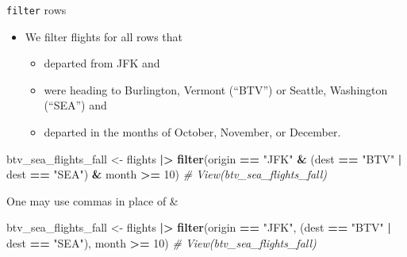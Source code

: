 \documentclass[
  ignorenonframetext,
]{beamer}
\newenvironment{Shaded}{\begin{snugshade}}{\end{snugshade}}
\newcommand{\CommentTok}[1]{\textcolor[rgb]{0.56,0.35,0.01}{\textit{#1}}}
\newcommand{\DecValTok}[1]{\textcolor[rgb]{0.00,0.00,0.81}{#1}}
\newcommand{\FunctionTok}[1]{\textcolor[rgb]{0.13,0.29,0.53}{\textbf{#1}}}
\newcommand{\NormalTok}[1]{#1}
\newcommand{\OtherTok}[1]{\textcolor[rgb]{0.56,0.35,0.01}{#1}}
\newcommand{\SpecialCharTok}[1]{\textcolor[rgb]{0.81,0.36,0.00}{\textbf{#1}}}
\newcommand{\StringTok}[1]{\textcolor[rgb]{0.31,0.60,0.02}{#1}}
\providecommand{\tightlist}{%
  \setlength{\itemsep}{0pt}\setlength{\parskip}{0pt}}
\begin{document}
\begin{frame}[fragile]{\texttt{filter} rows}
\label{filter-rows-3}
\begin{itemize}
\item
  We filter flights for all rows that

  \begin{itemize}
  \tightlist
  \item
    departed from JFK and
  \item
    were heading to Burlington, Vermont (``BTV'') or Seattle, Washington
    (``SEA'') and
  \item
    departed in the months of October, November, or December.
  \end{itemize}
\end{itemize}

\normalsize

\begin{Shaded}
\begin{Highlighting}[]
\NormalTok{btv\_sea\_flights\_fall }\OtherTok{\textless{}{-}}\NormalTok{ flights }\SpecialCharTok{|\textgreater{}} 
  \FunctionTok{filter}\NormalTok{(origin }\SpecialCharTok{==} \StringTok{"JFK"} \SpecialCharTok{\&}\NormalTok{ (dest }\SpecialCharTok{==} \StringTok{"BTV"} \SpecialCharTok{|}\NormalTok{ dest }\SpecialCharTok{==} \StringTok{"SEA"}\NormalTok{) }\SpecialCharTok{\&} 
\NormalTok{         month }\SpecialCharTok{\textgreater{}=} \DecValTok{10}\NormalTok{)}
\CommentTok{\# View(btv\_sea\_flights\_fall)}
\end{Highlighting}
\end{Shaded}

\normalsize

One may use commas in place of \&

\normalsize

\begin{Shaded}
\begin{Highlighting}[]
\NormalTok{btv\_sea\_flights\_fall }\OtherTok{\textless{}{-}}\NormalTok{ flights }\SpecialCharTok{|\textgreater{}} 
  \FunctionTok{filter}\NormalTok{(origin }\SpecialCharTok{==} \StringTok{"JFK"}\NormalTok{, (dest }\SpecialCharTok{==} \StringTok{"BTV"} \SpecialCharTok{|}\NormalTok{ dest }\SpecialCharTok{==} \StringTok{"SEA"}\NormalTok{), }
\NormalTok{         month }\SpecialCharTok{\textgreater{}=} \DecValTok{10}\NormalTok{)}
\CommentTok{\# View(btv\_sea\_flights\_fall)}
\end{Highlighting}
\end{Shaded}

\normalsize
\end{frame}
\end{document}
